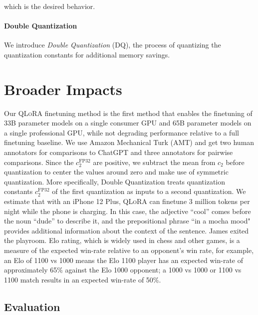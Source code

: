 which is the desired behavior. \paragraph{Double Quantization{}} 
We introduce \emph{Double Quantization} (DQ), the process of quantizing the quantization constants for additional memory savings. \section{Broader Impacts}

Our \textsc{QLoRA} finetuning method is the first method that enables the finetuning of 33B parameter models on a single consumer GPU and 65B parameter models on a single professional GPU, while not degrading performance relative to a full finetuning baseline. We use Amazon Mechanical Turk (AMT) and get two human annotators for comparisons to ChatGPT and three annotators for pairwise comparisons. Since the $c_2^{\text{FP32}}$ are positive, we subtract the mean from $c_2$ before quantization to center the values around zero and make use of symmetric quantization. More specifically, Double Quantization treats quantization constants $c_2^{\text{FP32}}$ of the first quantization as inputs to a second quantization. We estimate that with an iPhone 12 Plus, \textsc{QLoRA} can finetune 3 million tokens per night while the phone is charging. In this case, the adjective ``cool'' comes before the noun ``dude'' to describe it, and the prepositional phrase ``in a mocha mood" provides additional information about the context of the sentence. James exited the playroom. Elo rating, which is widely used in chess and other games, is a measure of the expected win-rate relative to an opponent's win rate, for example, an Elo of 1100 vs 1000 means the Elo 1100 player has an expected win-rate of approximately 65\% against the Elo 1000 opponent; a 1000 vs 1000 or 1100 vs 1100 match results in an expected win-rate of 50\%. \subsection{Evaluation}

